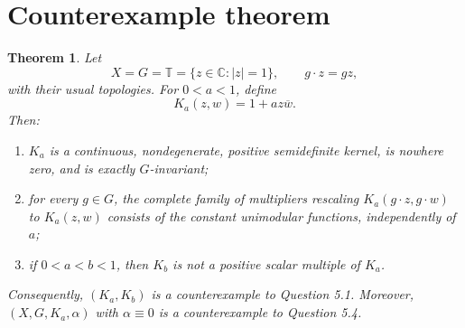 \documentclass[11pt]{article}
\newtheorem{theorem}{Theorem}
\begin{document}
\section{Counterexample theorem}
\begin{theorem}
Let
\[
 X=G=\mathbb T=\{z\in\mathbb C:|z|=1\},\qquad
 g\cdot z=gz,
\]
with their usual topologies.  For $0<a<1$, define
\[
 K_a(z,w)=1+a z\overline w.
\]
Then:
\begin{enumerate}
\item $K_a$ is a continuous, nondegenerate, positive semidefinite kernel,
      is nowhere zero, and is exactly $G$-invariant;
\item for every $g\in G$, the complete family of multipliers rescaling
      $K_a(g\cdot z,g\cdot w)$ to $K_a(z,w)$ consists of the constant
      unimodular functions, independently of $a$;
\item if $0<a<b<1$, then $K_b$ is not a positive scalar multiple of $K_a$.
\end{enumerate}
Consequently, $(K_a,K_b)$ is a counterexample to Question 5.1.  Moreover,
$(X,G,K_a,\alpha)$ with $\alpha\equiv0$ is a counterexample to Question 5.4.
\end{theorem}
\end{document}
